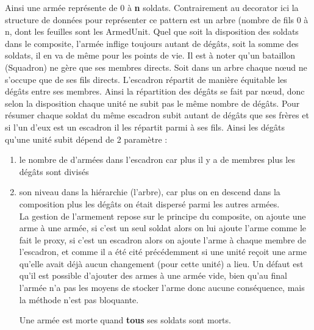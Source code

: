 ﻿\documentclass[12pt]{article}
\begin{document}
Ainsi une armée représente de 0 à \textbf{n} soldats.
Contrairement au decorator ici la structure de données pour représenter ce pattern
est un arbre (nombre de fils 0 à n, dont les feuilles sont les ArmedUnit.
Quel que soit la disposition des soldats dans le composite, l'armée inflige 
toujours autant de dégâts, soit la somme des soldats, il en va de même pour les 
points de vie.
Il est à noter qu'un bataillon (Squadron) ne gère que ses membres directs.
Soit dans un arbre chaque nœud ne s'occupe que de ses fils directs.
L'escadron répartit de manière équitable les dégâts entre ses membres.
Ainsi la répartition des dégâts se fait par nœud, donc selon la disposition
chaque unité ne subit pas le même nombre de dégâts.
Pour résumer chaque soldat du même escadron subit autant de dégâts que
ses frères et si l'un d'eux est un escadron il les répartit parmi à ses
fils.
Ainsi les dégâts qu'une unité subit dépend de 2 paramètre :
\begin{enumerate}
\item le nombre de d'armées dans l'escadron car plus il y a de membres plus
les dégâts sont divisés
\item son niveau dans la hiérarchie (l'arbre), car plus on en descend dans la
composition plus les dégâts on était dispersé parmi les autres armées.\\
La gestion de l'armement repose sur le principe du composite, on ajoute une arme
à une armée, si c'est un seul soldat alors on lui ajoute l'arme comme le fait le
proxy, si c'est un escadron alors on ajoute l'arme à chaque membre de l'escadron,
et comme il a été cité précédemment si une unité reçoit une arme qu'elle avait
déjà aucun changement (pour cette unité) a lieu.
Un défaut est qu'il est possible d'ajouter des armes à une armée vide,
bien qu'au final l'armée n'a pas les moyens de stocker l'arme donc aucune 
conséquence, mais la méthode n'est pas bloquante.

Une armée est morte quand \textbf{tous} ses soldats sont morts.
\end{enumerate}
\end{document}
